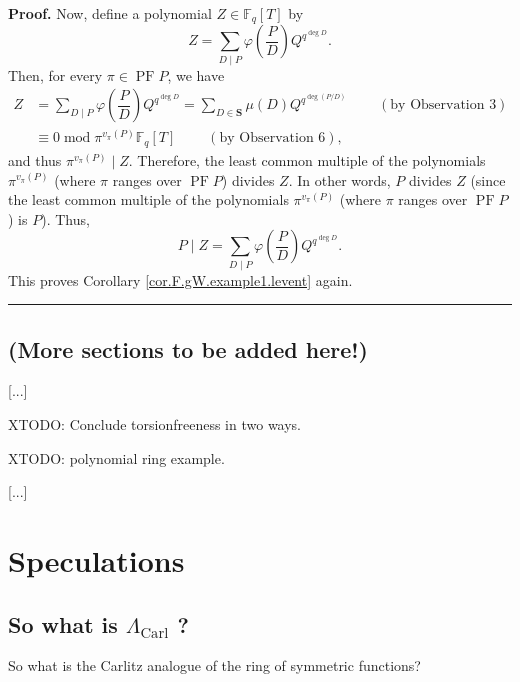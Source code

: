 \documentclass[numbers=enddot,12pt,final,onecolumn,notitlepage]{scrartcl}%
\theoremstyle{definition}
\newenvironment{proof}[1][Proof]{\noindent\textbf{#1.} }{\ \rule{0.5em}{0.5em}}
\let\sumnonlimits\sum
\renewcommand{\sum}{\sumnonlimits\limits}
\begin{document}
\begin{proof}
Now, define a polynomial $Z\in\mathbb{F}_{q}\left[  T\right]  $ by%
\[
Z=\sum_{D\mid P}\varphi\left(  \dfrac{P}{D}\right)  Q^{q^{\deg D}}.
\]
Then, for every $\pi\in\operatorname*{PF}P$, we have%
\begin{align*}
Z  &  =\sum_{D\mid P}\varphi\left(  \dfrac{P}{D}\right)  Q^{q^{\deg D}}%
=\sum_{D\in\mathbf{S}}\mu\left(  D\right)  Q^{q^{\deg\left(  P/D\right)  }%
}\ \ \ \ \ \ \ \ \ \ \left(  \text{by Observation 3}\right) \\
&  \equiv0\operatorname{mod}\pi^{v_{\pi}\left(  P\right)  }\mathbb{F}%
_{q}\left[  T\right]  \ \ \ \ \ \ \ \ \ \ \left(  \text{by Observation
6}\right)  ,
\end{align*}
and thus $\pi^{v_{\pi}\left(  P\right)  }\mid Z$. Therefore, the least common
multiple of the polynomials $\pi^{v_{\pi}\left(  P\right)  }$ (where $\pi$
ranges over $\operatorname*{PF}P$) divides $Z$. In other words, $P$ divides
$Z$ (since the least common multiple of the polynomials $\pi^{v_{\pi}\left(
P\right)  }$ (where $\pi$ ranges over $\operatorname*{PF}P$) is $P$). Thus,%
\[
P\mid Z=\sum_{D\mid P}\varphi\left(  \dfrac{P}{D}\right)  Q^{q^{\deg D}}.
\]
This proves Corollary \ref{cor.F.gW.example1.levent} again.
\end{proof}

\subsection{(More sections to be added here!)}

[...]

XTODO: Conclude torsionfreeness in two ways.

XTODO: polynomial ring example.

[...]


\section{\label{sect.tinfoil}Speculations}

\subsection{So what is $\Lambda_{\operatorname*{Carl}}$ ?}

So what is the Carlitz analogue of the ring of symmetric functions?
\end{document}
